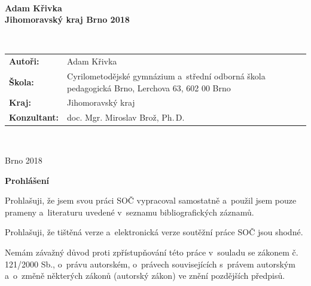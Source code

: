 \documentclass[A4paper, 12pt, oneside]{book}
\begin{document}
\pagestyle{empty}
\begin{center}
	{\fontsize{18pt}{22pt}\selectfont {}} \\
	{\fontsize{14pt}{17pt}\selectfont {}}
\end{center}
\vfill
\begin{center}
	{\fontsize{20pt}{26pt}\selectfont {}}
\end{center}
\vfill
{\large \bfseries Adam Křivka \\
	Jihomoravský kraj \hfill Brno 2018}
\newpage

\begin{center}
	{\fontsize{18pt}{22pt}\selectfont {}} \\
	{\fontsize{14pt}{17pt}\selectfont {}}
\end{center}
\vfill
\begin{center}
	{\fontsize{20pt}{26pt}\selectfont {}}

	 {\fontsize{20pt}{26pt}\selectfont {}}
\end{center}
\vfill
\begin{tabularx}{\textwidth}{lX}
	{\bfseries Autoři:} & Adam Křivka \\
	{\bfseries Škola:} & Cyrilometodějské gymnázium a~střední odborná škola pedagogická Brno, Lerchova 63, 602 00 Brno \\
	{\bfseries Kraj:} & Jihomoravský kraj \\
	{\bfseries Konzultant:} & doc. Mgr. Miroslav Brož, Ph.\,D.
\end{tabularx}

\

\noindent Brno 2018

\newpage

{\large \bfseries Prohlášení}

Prohlašuji, že jsem svou práci SOČ vypracoval samostatně a~použil jsem pouze prameny a~literaturu uvedené v~seznamu bibliografických záznamů.

Prohlašuji, že tištěná verze a~elektronická verze soutěžní práce SOČ jsou shodné. 

Nemám závažný důvod proti zpřístupňování této práce v~souladu se zákonem č. 121/2000 Sb., o~právu autorském, o~právech souvisejících s~právem autorským a~o~změně některých zákonů (autorský zákon) ve znění pozdějších předpisů. 
\end{document}
